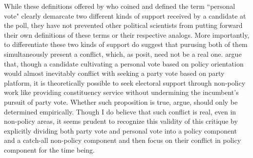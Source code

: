 \documentclass[hyphens, crop=false]{standalone}
\begin{document}
		
		While
		these definitions offered by
		\citeauthor{cainPersonalVoteConstituency1987}
		\autocite*{cainPersonalVoteConstituency1987}
		who coined and defined the term ``personal vote"
		clearly demarcate two different kinds of support
		received by a candidate at the poll,
		they have not prevented other political scientists from
		putting forward their own definitions of these terms or their respective analogs.
		More importantly,
		to differentiate these two kinds of support
		do suggest that purusing both of them simultaneously present a conflict,
		which,
		as
		\citeauthor{carseyRethinkingNormalVote2017}
		\autocite*{carseyRethinkingNormalVote2017}
		posit,
		need not be a real one.
%		
		\citeauthor{carseyRethinkingNormalVote2017}
		\autocite*{carseyRethinkingNormalVote2017}
		argue that,
		though a candidate cultivating a personal vote based on policy orientation
		would almost inevitably conflict with seeking a party vote based on party platform,
		it is theoretically possible to
		seek electoral support through non-policy work like providing constituency service
		without undermining the incumbent's pursuit of party vote.
		Whether such proposition is true,
		\citeauthor{carseyRethinkingNormalVote2017}
		\autocite*{carseyRethinkingNormalVote2017}
		argue,
		should only be determined empirically.
%		
		Though I do believe that such conflict is real, even in non-policy areas,
		it seems prudent
		to recognize this validity of this critique 
		by explicitly dividing both party vote and personal vote into
		a
		policy component
		and a
		catch-all
		non-policy component
		and
		then
		focus on their conflict in policy component for the time being.
		
\end{document}
